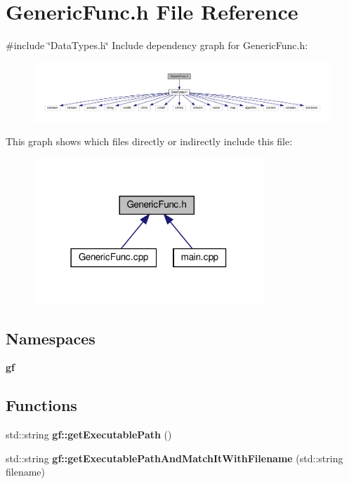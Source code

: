 \section{Generic\+Func.\+h File Reference}
\label{_generic_func_8h}
{\ttfamily \#include \char`\"{}Data\+Types.\+h\char`\"{}}\newline
Include dependency graph for Generic\+Func.\+h\+:\nopagebreak
\begin{figure}[H]
\begin{center}
\leavevmode
\includegraphics[width=350pt]{_generic_func_8h__incl}
\end{center}
\end{figure}
This graph shows which files directly or indirectly include this file\+:\nopagebreak
\begin{figure}[H]
\begin{center}
\leavevmode
\includegraphics[width=246pt]{_generic_func_8h__dep__incl}
\end{center}
\end{figure}
\subsection*{Namespaces}
\begin{DoxyCompactItemize}
\item 
 \textbf{ gf}
\end{DoxyCompactItemize}
\subsection*{Functions}
\begin{DoxyCompactItemize}
\item 
std\+::string \textbf{ gf\+::get\+Executable\+Path} ()
\item 
std\+::string \textbf{ gf\+::get\+Executable\+Path\+And\+Match\+It\+With\+Filename} (std\+::string filename)
\end{DoxyCompactItemize}
